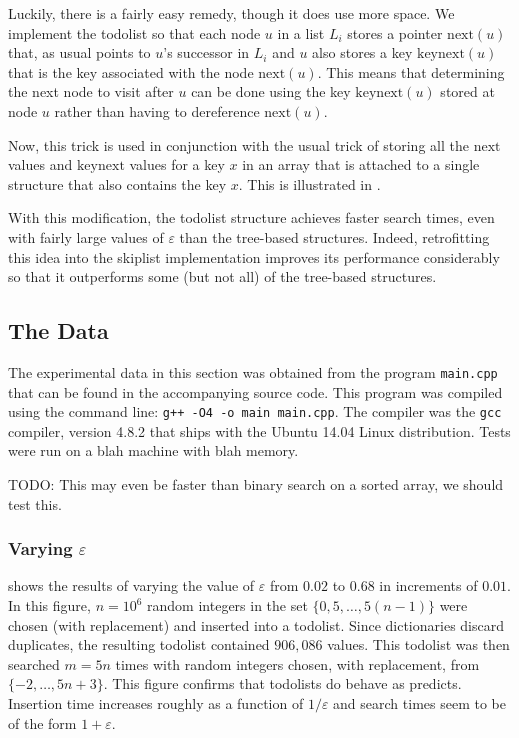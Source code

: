 \documentclass[lotsofwhite]{patmorin}
\newcommand{\eps}{\varepsilon}
\begin{document}
Luckily, there is a fairly easy remedy, though it does use more space.
We implement the todolist so that each node $u$ in a list $L_i$ stores
a pointer $\mathrm{next}(u)$ that, as usual points to $u$'s successor
in $L_i$ and $u$ also stores a key $\mathrm{keynext}(u)$ that is the
key associated with the node $\mathrm{next}(u)$.  This means that
determining the next node to visit after $u$ can be done using the
key $\mathrm{keynext}(u)$ stored at node $u$ rather than having to
dereference $\mathrm{next}(u)$.

Now, this trick is used in conjunction with the usual trick of storing all
the $\mathrm{next}$ values and $\mathrm{keynext}$ values for a key $x$
in an array that is attached to a single structure that also contains
the key $x$.  This is illustrated in .

With this modification, the todolist structure achieves faster search
times, even with fairly large values of $\eps$ than the tree-based
structures. Indeed, retrofitting this idea into the skiplist
implementation improves its performance considerably so that it
outperforms some (but not all) of the tree-based structures.

\subsection{The Data}

The experimental data in this section was obtained from the program
\texttt{main.cpp} that can be found in the accompanying source code.
This program was compiled using the command line: \texttt{g++ -O4 -o
main main.cpp}. The compiler was the \texttt{gcc} compiler, version 4.8.2
that ships with the Ubuntu 14.04 Linux distribution.  Tests were run on
a blah machine with blah memory.

TODO: This may even be faster than binary search on a sorted array, we should test this.

\subsubsection{Varying $\eps$}

 shows the results of varying the value of $\eps$ from
$0.02$ to $0.68$ in increments of $0.01$. In this figure, $n=10^6$
random integers in the set $\{0, 5,\ldots,5(n-1)\}$ were chosen
(with replacement) and inserted into a todolist. Since dictionaries
discard duplicates, the resulting todolist contained $906,086$ values.
This todolist was then searched $m=5n$ times with random integers chosen,
with replacement, from $\{-2,\ldots,5n+3\}$.  This figure confirms
that todolists do behave as  predicts.  Insertion time
increases roughly as a function of $1/\eps$ and search times seem to be
of the form $1+\eps$.
\end{document}
